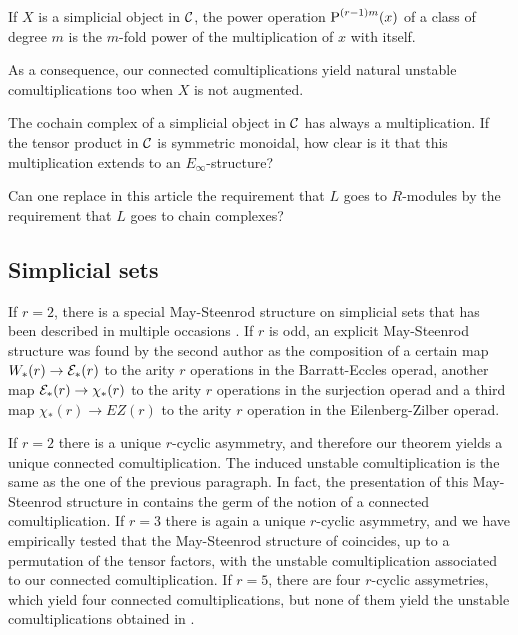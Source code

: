 \begin{theorem}
	If $X$ is a simplicial object in $\mathcal{C}$, the power operation $\operatorname{P}^{(r-1)m}(x)$ of a class of degree $m$ is the $m$-fold power of the multiplication of $x$ with itself.
\end{theorem}
As a consequence, our connected comultiplications yield natural unstable comultiplications too when $X$ is not augmented.

\begin{question}
	The cochain complex of a simplicial object in $\mathcal{C}$ has always a multiplication. If the tensor product in $\mathcal{C}$ is symmetric monoidal, how clear is it that this multiplication extends to an $E_{\infty}$-structure? 
\end{question}

\begin{question}
	Can one replace in this article the requirement that $L$ goes to $R$-modules by the requirement that $L$ goes to chain complexes?
\end{question}

\subsection*{Simplicial sets}

If $r=2$, there is a special May-Steenrod structure on simplicial sets that has been described in multiple occasions \cite{steenrod1947products,gonzalez-diaz1999steenrod,medina2021fast_sq}. If $r$ is odd, an explicit May-Steenrod structure was found by the second author \cite{medina2021may_st} as the composition of a certain map $W_*(r)\to \mathcal{E}_*(r)$ to the arity $r$ operations in the Barratt-Eccles operad, another map $\mathcal{E}_*(r)\to \chi_*(r)$ to the arity $r$ operations in the surjection operad \cite{berger2004combinatorial} and a third map $\chi_*(r)\to EZ(r)$ to the arity $r$ operation in the Eilenberg-Zilber operad\cite{mcclure2003multivariable}.

If $r=2$ there is a unique $r$-cyclic asymmetry, and therefore our theorem yields a unique connected comultiplication. The induced unstable comultiplication is the same as the one of the previous paragraph. In fact, the presentation of this May-Steenrod structure in \cite{medina2021fast_sq} contains the germ of the notion of a connected comultiplication. If $r=3$ there is again a unique $r$-cyclic asymmetry, and we have empirically tested that the May-Steenrod structure of \cite{medina2021may_st} coincides, up to a permutation of the tensor factors, with the unstable comultiplication associated to our connected comultiplication. If $r= 5$, there are four $r$-cyclic assymetries, which yield four connected comultiplications, but none of them yield the unstable comultiplications obtained in \cite{medina2021may_st}.

